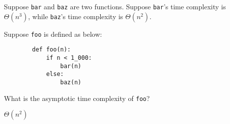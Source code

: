 \begin{prob}
    Suppose \texttt{bar} and \texttt{baz} are two functions.
    Suppose \texttt{bar}'s time complexity is $\Theta(n^3)$, while \texttt{baz}'s
    time complexity is $\Theta(n^2)$.

    Suppose \texttt{foo} is defined as below:

    \begin{verbatim}
        def foo(n):
            if n < 1_000:
                bar(n)
            else:
                baz(n)
    \end{verbatim}

    What is the asymptotic time complexity of \texttt{foo}?

    \begin{soln}
        $\Theta(n^2)$
    \end{soln}
\end{prob}
